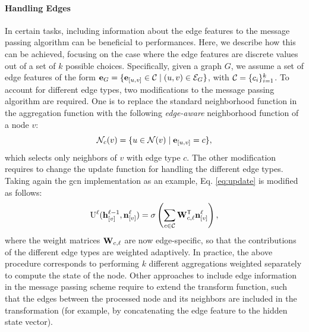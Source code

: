 \paragraph{Handling Edges}
In certain tasks, including information about the edge features to the message passing algorithm can be beneficial to performances. Here, we describe how this can be achieved, focusing on the case where the edge features are discrete values out of a set of $k$ possible choices. Specifically, given a graph $G$, we assume a set of edge features of the form $\Vector{e}_G = \Set{\Elem{e}{u,v} \in \Cal{C} \mid (u, v) \in \Cal{E}_G}$, with $\Cal{C} = \Set{c_i}_{i=1}^k$. To account for different edge types, two modifications to the message passing algorithm are required. One is to replace the standard neighborhood function in the aggregation function with the following \emph{edge-aware} neighborhood function of a node $v$:
$$\Cal{N}_c(v) = \Set{u \in \Cal{N}(v) \mid \Elem{e}{u, v} = c},$$
which selects only neighbors of $v$ with edge type $c$. The other modification requires to change the update function for handling the different edge types. Taking again the \gls{gcn} implementation as an example, Eq. \ref{eq:update} is modified as follows:
\begin{align*}
    \Fun{U}^{\ell}(\Elem{h}{v}^{\ell-1}, \Elem{n}{v}^{\ell}) = \sigma\Paren{\sum_{c \in \Cal{C}} \Matrix{W}^{\Transpose}_{c,\ell} \Elem{n}{v}^{\ell}},
\end{align*}
where the weight matrices $\Matrix{W}_{c,\ell}$ are now edge-specific, so that the contributions of the different edge types are weighted adaptively. In practice, the above procedure corresponds to performing $k$ different aggregations weighted separately to compute the state of the node. Other approaches to include edge information in the message passing scheme require to extend the transform function, such that the edges between the processed node and its neighbors are included in the transformation (for example, by concatenating the edge feature to the hidden state vector).

